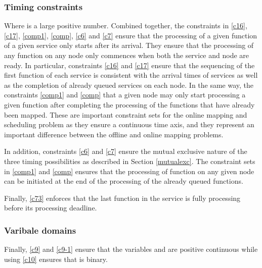 \documentclass[conference]{IEEEtran}
\begin{document}
\subsubsection{Timing constraints}

















Where  is a large positive number. Combined together, the constraints in \eqref{c16}, \eqref{c17}, \eqref{comp1}, \eqref{comp}, \eqref{c6} and \eqref{c7} ensure that the processing of a given function of a given service only starts after its arrival. They ensure that the processing of any function on any node only commences when both the service and node are ready. In particular, constraints \eqref{c16} and \eqref{c17} ensure that the sequencing of the first function of each service is consistent with the arrival times of services as well as the completion of already queued services on each node. In the same way, the constraints \eqref{comp1} and \eqref{comp} that a given node may only start processing a given function after completing the processing of the functions that have already been mapped. These are important constraint sets for the online mapping and scheduling problem as they ensure a continuous time axis, and they represent an important difference between the offline and online mapping problems. 

In addition, constraints \eqref{c6} and \eqref{c7} ensure the mutual exclusive nature of the three timing possibilities as described in Section \ref{mutualexc}. The constraint sets in \eqref{comp1} and \eqref{comp} ensures that the processing of function on any given node can be initiated at the end of the processing of the already queued functions.

Finally, \eqref{c73} enforces that the last function in the service is fully processing before its processing deadline.

\subsubsection{Varibale domains}







Finally, \eqref{c9} and \eqref{c9-1} ensure that the variables  and  are positive continuous while using \eqref{c10} ensures that  is binary.
\end{document}
